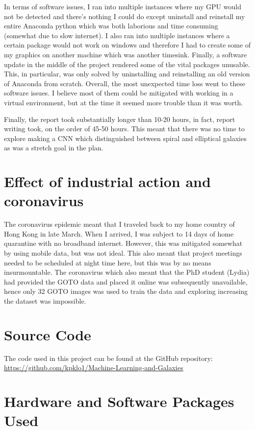 \documentclass[a4paper,fleqn,usenatbib]{mnras}
\begin{document}
In terms of software issues, I ran into multiple instances where my GPU would not be detected and there's nothing I could do except uninstall and reinstall my entire Anaconda python which was both laborious and time consuming (somewhat due to slow internet). I also ran into multiple instances where a certain package would not work on windows and therefore I had to create some of my graphics on another machine which was another timesink. Finally, a software update in the middle of the project rendered some of the vital packages unusable. This, in particular, was only solved by uninstalling and reinstalling an old version of Anaconda from scratch. Overall, the most unexpected time loss went to these software issues. I believe most of them could be mitigated with working in a virtual environment, but at the time it seemed more trouble than it was worth. 

Finally, the report took substantially longer than 10-20 hours, in fact, report writing took, on the order of 45-50 hours. This meant that there was no time to explore making a CNN which distinguished between spiral and elliptical galaxies as was a stretch goal in the plan.
\section{Effect of industrial action and coronavirus}
\label{2020 special}
The coronavirus epidemic meant that I traveled back to my home country of Hong Kong in late March. When I arrived, I was subject to 14 days of home quarantine with no broadband internet. However, this was mitigated somewhat by using mobile data, but was not ideal. This also meant that project meetings needed to be scheduled at night time here, but this was by no means insurmountable. The coronavirus which also meant that the PhD student (Lydia) had provided the GOTO data and placed it online was subsequently unavailable, hence only 32 GOTO images was used to train the data and exploring increasing the dataset was impossible. 


\section{Source Code}
\label{Code}
The code used in this project can be found at the GitHub repository: \url{https://github.com/kpklo1/Machine-Learning-and-Galaxies}

\section{Hardware and Software Packages Used}
\label{HSWare}
\end{document}
